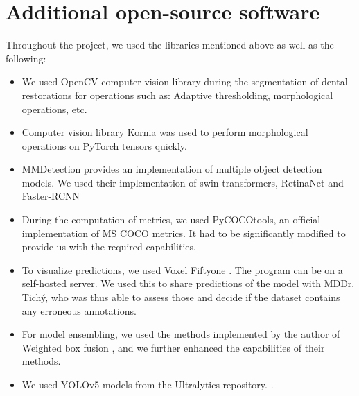 \section{Additional open-source software}
Throughout the project, we used the libraries mentioned above as well as the following:
\begin{itemize}
    \item We used OpenCV \cite{opencv_library} computer vision library during the segmentation of dental restorations for operations such as: Adaptive thresholding, morphological operations, etc.
    \item Computer vision library Kornia \cite{eriba2019kornia} was used to perform morphological operations on PyTorch tensors quickly.
    \item MMDetection \cite{mmdetection} provides an implementation of multiple object detection models. We used their implementation of swin transformers, RetinaNet and Faster-RCNN
    \item During the computation of metrics, we used PyCOCOtools, an official \cite{pycocotools} implementation of MS COCO metrics. It had to be significantly modified to provide us with the required capabilities.
    \item To visualize predictions, we used Voxel Fiftyone \cite{moorefiftyone}. The program can be on a self-hosted server. We used this to share predictions of the model with MDDr. Tichý, who was thus able to assess those and decide if the dataset contains any erroneous annotations.
    \item For model ensembling, we used the methods implemented by the author of Weighted box fusion \cite{Solovyev2019}, and we further enhanced the capabilities of their methods.
    \item We used YOLOv5 models from the Ultralytics repository. \cite{glennjocher2020}.
\end{itemize}